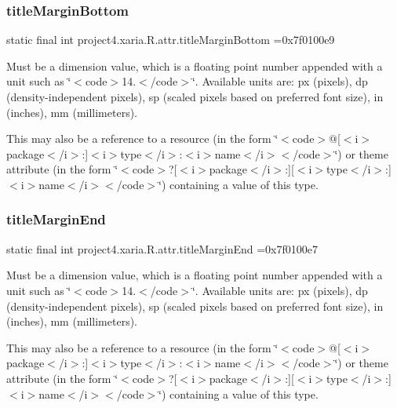 \subsubsection{\texorpdfstring{title\+Margin\+Bottom}{titleMarginBottom}}
{\footnotesize\ttfamily static final int project4.\+xaria.\+R.\+attr.\+title\+Margin\+Bottom =0x7f0100e9\hspace{0.3cm}{\ttfamily [static]}}

Must be a dimension value, which is a floating point number appended with a unit such as \char`\"{}$<$code$>$14.\+5sp$<$/code$>$\char`\"{}. Available units are\+: px (pixels), dp (density-\/independent pixels), sp (scaled pixels based on preferred font size), in (inches), mm (millimeters). 

This may also be a reference to a resource (in the form \char`\"{}$<$code$>$@\mbox{[}$<$i$>$package$<$/i$>$\+:\mbox{]}$<$i$>$type$<$/i$>$\+:$<$i$>$name$<$/i$>$$<$/code$>$\char`\"{}) or theme attribute (in the form \char`\"{}$<$code$>$?\mbox{[}$<$i$>$package$<$/i$>$\+:\mbox{]}\mbox{[}$<$i$>$type$<$/i$>$\+:\mbox{]}$<$i$>$name$<$/i$>$$<$/code$>$\char`\"{}) containing a value of this type. \mbox{\label{classproject4_1_1xaria_1_1R_1_1attr_a062d6f4d6131631de7f24681a4d3e76b}} 
\subsubsection{\texorpdfstring{title\+Margin\+End}{titleMarginEnd}}
{\footnotesize\ttfamily static final int project4.\+xaria.\+R.\+attr.\+title\+Margin\+End =0x7f0100e7\hspace{0.3cm}{\ttfamily [static]}}

Must be a dimension value, which is a floating point number appended with a unit such as \char`\"{}$<$code$>$14.\+5sp$<$/code$>$\char`\"{}. Available units are\+: px (pixels), dp (density-\/independent pixels), sp (scaled pixels based on preferred font size), in (inches), mm (millimeters). 

This may also be a reference to a resource (in the form \char`\"{}$<$code$>$@\mbox{[}$<$i$>$package$<$/i$>$\+:\mbox{]}$<$i$>$type$<$/i$>$\+:$<$i$>$name$<$/i$>$$<$/code$>$\char`\"{}) or theme attribute (in the form \char`\"{}$<$code$>$?\mbox{[}$<$i$>$package$<$/i$>$\+:\mbox{]}\mbox{[}$<$i$>$type$<$/i$>$\+:\mbox{]}$<$i$>$name$<$/i$>$$<$/code$>$\char`\"{}) containing a value of this type. \mbox{\label{classproject4_1_1xaria_1_1R_1_1attr_ae9ef3130a8d3b2c8c623df648df77149}} 
